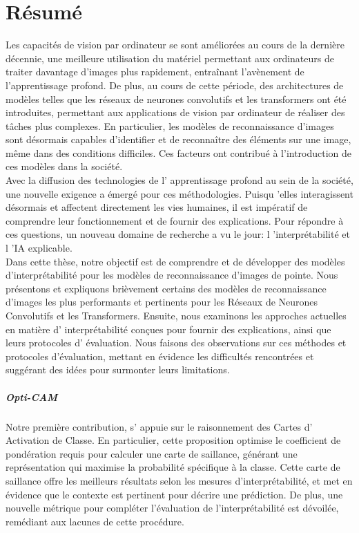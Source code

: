 \chapter*{Résumé}
Les capacités de vision par ordinateur se sont améliorées au cours de la dernière décennie, une 
meilleure utilisation du matériel permettant aux ordinateurs de traiter davantage d'images plus 
rapidement, entraînant l'avènement de l'apprentissage profond. De plus, au cours de cette période, 
des architectures de modèles telles que les réseaux de neurones convolutifs et les transformers 
ont été introduites, permettant aux applications de vision par ordinateur de réaliser des tâches 
plus complexes. En particulier, les modèles de reconnaissance d'images sont désormais capables 
d'identifier et de reconnaître des éléments sur une image, même dans des conditions difficiles. 
Ces facteurs ont contribué à l'introduction de ces modèles dans la société.\\

\noindent Avec la diffusion des technologies de l' apprentissage profond au sein de la société, 
une nouvelle exigence a émergé pour ces méthodologies. Puisqu 'elles interagissent désormais et 
affectent directement les vies humaines, il est impératif de comprendre leur fonctionnement et de 
fournir des explications. Pour répondre à ces questions, un nouveau domaine de recherche a vu le 
jour: l 'interprétabilité et l 'IA explicable.\\

\noindent Dans cette thèse, notre objectif est de comprendre et de développer des modèles 
d'interprétabilité pour les modèles de reconnaissance d'images de pointe. Nous présentons et 
expliquons brièvement certains des modèles de reconnaissance d'images les plus performants et 
pertinents pour les Réseaux de Neurones Convolutifs et les Transformers. Ensuite, nous examinons 
les approches actuelles en matière d' interpr\'etabilit\'e conçues pour fournir des explications, 
ainsi que leurs protocoles d' évaluation. Nous faisons des observations sur ces méthodes et 
protocoles d'évaluation, mettant en évidence les difficultés rencontrées et suggérant des idées 
pour surmonter leurs limitations.\\

\paragraph{Opti-CAM} Notre première contribution, s' appuie sur le raisonnement des Cartes d' 
Activation de Classe. En particulier, cette proposition optimise le coefficient de pondération 
requis pour calculer une carte de saillance, générant une représentation qui maximise la 
probabilité spécifique à la classe. Cette carte de saillance offre les meilleurs résultats selon 
les mesures d'interprétabilité, et met en évidence que le contexte est pertinent pour décrire une 
prédiction. De plus, une nouvelle métrique pour compléter l'évaluation de l'interprétabilité est 
dévoilée, remédiant aux lacunes de cette procédure.\\


